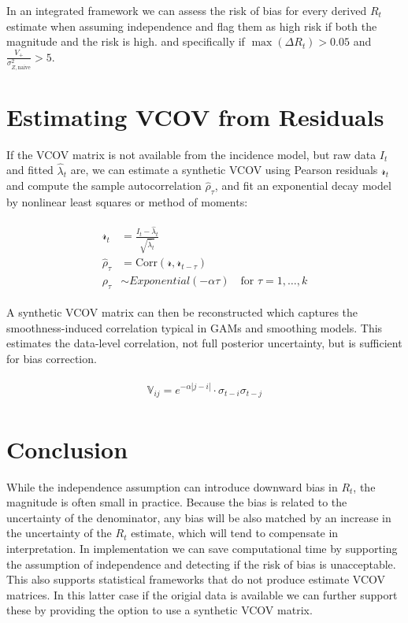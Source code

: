 \documentclass[a4paper, 12pt, twoside]{article}
\let\Oldsection\section
\renewcommand{\section}{\FloatBarrier\Oldsection}
\begin{document}
In an integrated framework we can assess the risk of bias for every derived $R_t$ estimate when assuming independence and flag them as high risk if both the magnitude and the risk is high. and specifically if $\max(\Delta R_t) > 0.05$ and $\frac{V_+}{\sigma_{Z,\text{naive}}^2} > 5$.

\section{Estimating VCOV from Residuals}

If the VCOV matrix is not available from the incidence model, but raw data $ I_t $ and fitted $ \hat{\lambda}_t $ are, we can estimate a synthetic VCOV using Pearson residuals $\mathcal{r}_t$ and compute the sample autocorrelation $ \hat{\rho}_\tau $, and fit an exponential decay model by nonlinear least squares or method of moments:

\begin{eqnarray}
\begin{aligned}
\mathcal{r}_t &= \frac{I_t - \hat{\lambda}_t}{\sqrt{\hat{\lambda}_t}} \\
\hat{\rho}_\tau &= \text{Corr}(\mathcal{r}, \mathcal{r}_{t-\tau}) \\
\rho_\tau &\sim Exponential(-\alpha \tau)
\quad \text{for } \tau = 1, \dots, k
\end{aligned}
\end{eqnarray}

A synthetic VCOV matrix can then be reconstructed which captures the smoothness-induced correlation typical in GAMs and smoothing models. This estimates the data-level correlation, not full posterior uncertainty, but is sufficient for bias correction.

\begin{eqnarray}
\begin{aligned}
\mathbb{V}_{ij} = e^{-\alpha |j-i|} \cdot \sigma_{t-i} \sigma_{t-j}
\end{aligned}
\end{eqnarray}

\section{Conclusion}

While the independence assumption can introduce downward bias in $ R_t $, the magnitude is often small in practice. Because the bias is related to the uncertainty of the denominator, any bias will be also matched by an increase in the uncertainty of the $R_t$ estimate, which will tend to compensate in interpretation. In implementation we can save computational time by supporting the assumption of independence and detecting if the risk of bias is unacceptable. This also supports statistical frameworks that do not produce estimate VCOV matrices. In this latter case if the origial data is available we can further support these by providing the option to use a synthetic VCOV matrix.


\end{document}
